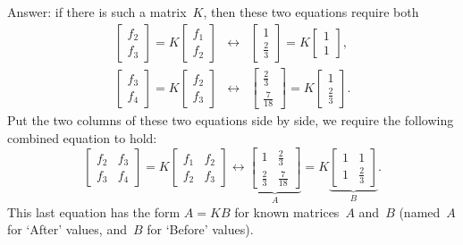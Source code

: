 \begin{example}
\begin{solution}
\begin{enumerate}[ref=\ref{eg:2expfit}(\alph*)]
Answer: if there is such a matrix~\(K\), then these two equations require both
\begin{eqnarray*}
\begin{bmatrix} f_2\\f_3 \end{bmatrix}
=K\begin{bmatrix} f_1\\f_2 \end{bmatrix}
&\leftrightarrow& \begin{bmatrix} 1\\\frac23 \end{bmatrix}
=K\begin{bmatrix} 1\\1 \end{bmatrix},
\\
\begin{bmatrix} f_3\\f_4 \end{bmatrix}
=K\begin{bmatrix} f_2\\f_3 \end{bmatrix}
&\leftrightarrow& \begin{bmatrix} \frac23\\\frac7{18} \end{bmatrix}
=K\begin{bmatrix} 1\\\frac23 \end{bmatrix}.
\end{eqnarray*}
Put the two columns of these two equations side by side, we require the following combined equation to hold:
\begin{equation*}
\begin{bmatrix} f_2&f_3\\f_3&f_4 \end{bmatrix}
=K\begin{bmatrix} f_1&f_2\\f_2&f_3 \end{bmatrix}
\leftrightarrow 
\underbrace{\begin{bmatrix} 1&\frac23\\\frac23&\frac7{18} \end{bmatrix}}_A
=K\underbrace{\begin{bmatrix} 1&1\\1&\frac23 \end{bmatrix}}_B.
\end{equation*}
This last equation has the form \(A=KB\) for known matrices~\(A\) and~\(B\) (named~\(A\) for `After' values, and~\(B\) for `Before' values).


\end{enumerate}
\end{solution}
\end{example}
